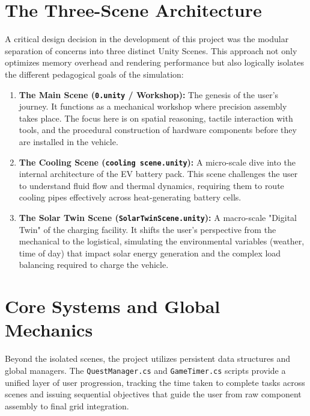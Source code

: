 \documentclass[12pt,a4paper,oneside]{report}
\begin{document}
\section{The Three-Scene Architecture}
A critical design decision in the development of this project was the modular separation of concerns into three distinct Unity Scenes. This approach not only optimizes memory overhead and rendering performance but also logically isolates the different pedagogical goals of the simulation:

\begin{enumerate}
    \item \textbf{The Main Scene (\texttt{0.unity} / Workshop):} The genesis of the user's journey. It functions as a mechanical workshop where precision assembly takes place. The focus here is on spatial reasoning, tactile interaction with tools, and the procedural construction of hardware components before they are installed in the vehicle.
    \item \textbf{The Cooling Scene (\texttt{cooling scene.unity}):} A micro-scale dive into the internal architecture of the EV battery pack. This scene challenges the user to understand fluid flow and thermal dynamics, requiring them to route cooling pipes effectively across heat-generating battery cells.
    \item \textbf{The Solar Twin Scene (\texttt{SolarTwinScene.unity}):} A macro-scale "Digital Twin" of the charging facility. It shifts the user's perspective from the mechanical to the logistical, simulating the environmental variables (weather, time of day) that impact solar energy generation and the complex load balancing required to charge the vehicle.
\end{enumerate}

\section{Core Systems and Global Mechanics}
Beyond the isolated scenes, the project utilizes persistent data structures and global managers. The \texttt{QuestManager.cs} and \texttt{GameTimer.cs} scripts provide a unified layer of user progression, tracking the time taken to complete tasks across scenes and issuing sequential objectives that guide the user from raw component assembly to final grid integration.

\end{document}
